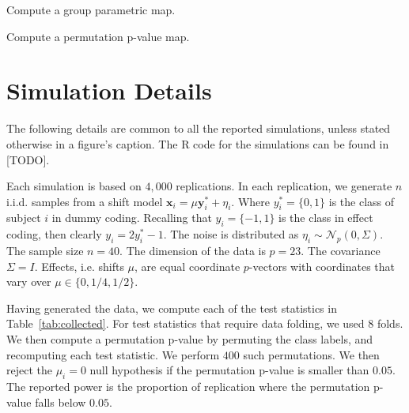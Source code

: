 \documentclass[12pt,a4paper]{article}
\theoremstyle{definition}
\newcommand{\set}[1]{\{ #1 \}} %
\newcommand{\rv}[1]{\mathbf{#1}} %
\newcommand{\x}{\rv x} %
\newcommand{\y}{\rv y} %
\newcommand{\gaussp}[2]{\mathcal{N}_{#1}\left(#2\right)} %
\newcommand{\R}{\textsf{R }}
\begin{document}
\begin{algorithm}[H]
\caption{Compute a group parametric map.}
\label{algo:statistic}

\end{algorithm}


\begin{algorithm}[H]
\caption{Compute a permutation p-value map.} 
\label{algo:permutation}

\end{algorithm}

\newpage


\section{Simulation Details}
\label{apx:simulation_details}

The following details are common to all the reported simulations, unless stated otherwise in a figure's caption. 
The \R code for the simulations can be found in [TODO].

Each simulation is based on $4,000$ replications. 
In each replication, we generate $n$ i.i.d. samples from a shift model $\x_i = \mu \y^*_i + \eta_i$.
Where $y^*_i=\set{0,1}$ is the class of subject $i$ in dummy coding. 
Recalling that $y_i=\set{-1,1}$ is the class in effect coding, then clearly $y_i=2 y^*_i-1$.
The noise is distributed as $\eta_i \sim \gaussp{p}{0,\Sigma}$. 
The sample size $n=40$. 
The dimension of the data is $p=23$. 
The covariance $\Sigma=I$. 
Effects, i.e. shifts $\mu$, are equal coordinate $p$-vectors with coordinates that vary over $\mu \in \set{0,1/4,1/2}$.

Having generated the data, we compute each of the test statistics in Table~\ref{tab:collected}.
For test statistics that require data folding, we used $8$ folds. 
We then compute a permutation p-value by permuting the class labels, and recomputing each test statistic. 
We perform $400$ such permutations. 
We then reject the $\mu_i=0$ null hypothesis if the permutation p-value is smaller than $0.05$.
The reported power is the proportion of replication where the permutation p-value falls below $0.05$.
\end{document}
